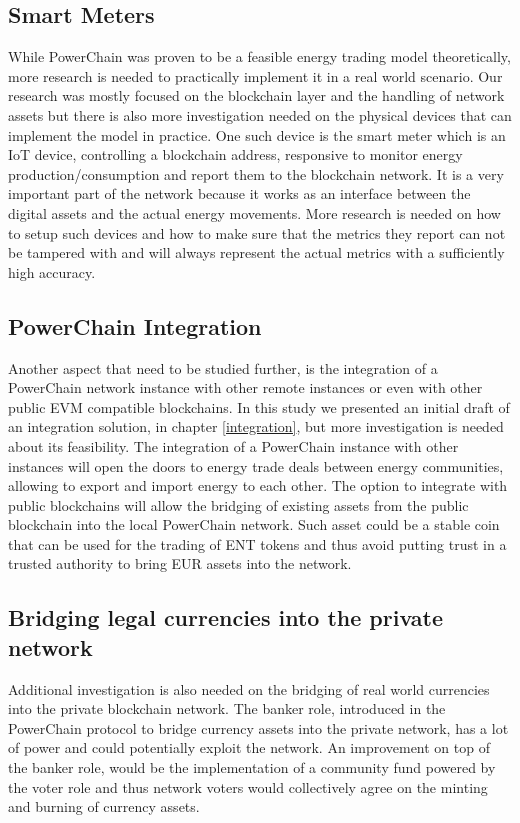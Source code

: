 \subsection*{Smart Meters}
While PowerChain was proven to be a feasible energy trading model theoretically, more research is needed to practically implement it in a real world scenario.
Our research was mostly focused on the blockchain layer and the handling of network assets but there is also more investigation needed on the
physical devices that can implement the model in practice. One such device is the smart meter which is an IoT device, controlling a blockchain address, 
responsive to monitor energy production/consumption and report them to the blockchain network. It is a very important part of the network
because it works as an interface between the digital assets and the actual energy movements. More research is needed on how to setup such
devices and how to make sure that the metrics they report can not be tampered with and will always represent the actual metrics with a sufficiently high accuracy.
\subsection*{PowerChain Integration}
Another aspect that need to be studied further, is the integration of a PowerChain network instance with other remote instances or even with other public EVM compatible blockchains.
In this study we presented an initial draft of an integration solution, in chapter \ref{integration}, but more investigation is needed about its feasibility. The integration of a PowerChain instance
with other instances will open the doors to energy trade deals between energy communities, allowing to export and import energy to each other. The option to integrate with
public blockchains will allow the bridging of existing assets from the public blockchain into the local PowerChain network. Such asset could be a stable coin that can be used
for the trading of ENT tokens and thus avoid putting trust in a trusted authority to bring EUR assets into the network.
\subsection*{Bridging legal currencies into the private network}
Additional investigation is also needed on the bridging of real world currencies into the private blockchain network. The banker role, introduced in the PowerChain protocol to bridge currency assets into
the private network, has a lot of power and could potentially exploit the network. An improvement on top of the banker role, would be the implementation of a community fund powered by the voter role and thus
network voters would collectively agree on the minting and burning of currency assets.
